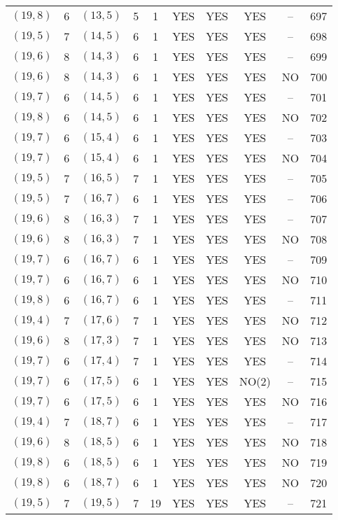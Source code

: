 \begin{longtable}{|c|c|c|c|c|c|c|c|c|c|}
$(19, 8)$ & 6 & $(13, 5)$ & 5 & 1 & YES & YES & YES & -- & 697\\
$(19, 5)$ & 7 & $(14, 5)$ & 6 & 1 & YES & YES & YES & -- & 698\\
$(19, 6)$ & 8 & $(14, 3)$ & 6 & 1 & YES & YES & YES & -- & 699\\
$(19, 6)$ & 8 & $(14, 3)$ & 6 & 1 & YES & YES & YES & NO & 700\\
$(19, 7)$ & 6 & $(14, 5)$ & 6 & 1 & YES & YES & YES & -- & 701\\
$(19, 8)$ & 6 & $(14, 5)$ & 6 & 1 & YES & YES & YES & NO & 702\\
$(19, 7)$ & 6 & $(15, 4)$ & 6 & 1 & YES & YES & YES & -- & 703\\
$(19, 7)$ & 6 & $(15, 4)$ & 6 & 1 & YES & YES & YES & NO & 704\\
$(19, 5)$ & 7 & $(16, 5)$ & 7 & 1 & YES & YES & YES & -- & 705\\
$(19, 5)$ & 7 & $(16, 7)$ & 6 & 1 & YES & YES & YES & -- & 706\\
$(19, 6)$ & 8 & $(16, 3)$ & 7 & 1 & YES & YES & YES & -- & 707\\
$(19, 6)$ & 8 & $(16, 3)$ & 7 & 1 & YES & YES & YES & NO & 708\\
$(19, 7)$ & 6 & $(16, 7)$ & 6 & 1 & YES & YES & YES & -- & 709\\
$(19, 7)$ & 6 & $(16, 7)$ & 6 & 1 & YES & YES & YES & NO & 710\\
$(19, 8)$ & 6 & $(16, 7)$ & 6 & 1 & YES & YES & YES & -- & 711\\
$(19, 4)$ & 7 & $(17, 6)$ & 7 & 1 & YES & YES & YES & NO & 712\\
$(19, 6)$ & 8 & $(17, 3)$ & 7 & 1 & YES & YES & YES & NO & 713\\
$(19, 7)$ & 6 & $(17, 4)$ & 7 & 1 & YES & YES & YES & -- & 714\\
$(19, 7)$ & 6 & $(17, 5)$ & 6 & 1 & YES & YES & NO(2) & -- & 715\\
$(19, 7)$ & 6 & $(17, 5)$ & 6 & 1 & YES & YES & YES & NO & 716\\
$(19, 4)$ & 7 & $(18, 7)$ & 6 & 1 & YES & YES & YES & -- & 717\\
$(19, 6)$ & 8 & $(18, 5)$ & 6 & 1 & YES & YES & YES & NO & 718\\
$(19, 8)$ & 6 & $(18, 5)$ & 6 & 1 & YES & YES & YES & NO & 719\\
$(19, 8)$ & 6 & $(18, 7)$ & 6 & 1 & YES & YES & YES & NO & 720\\
$(19, 5)$ & 7 & $(19, 5)$ & 7 & 19 & YES & YES & YES & -- & 721\\

\end{longtable}
